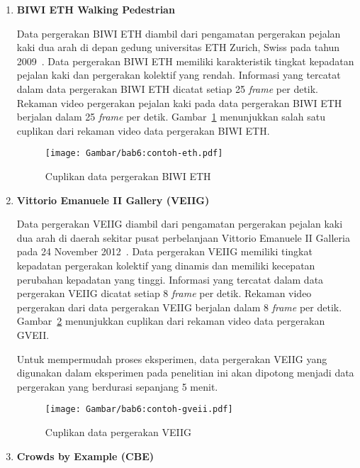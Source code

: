\begin{enumerate}
    \item \textbf{BIWI ETH Walking Pedestrian}
    
    Data pergerakan BIWI ETH diambil dari pengamatan pergerakan pejalan kaki dua arah di depan gedung universitas ETH Zurich, Swiss pada tahun 2009~\cite{pellegrini:eth}. Data pergerakan BIWI ETH memiliki karakteristik tingkat kepadatan pejalan kaki dan pergerakan kolektif yang rendah. Informasi yang tercatat dalam data pergerakan BIWI ETH dicatat setiap 2\.5 \textit{frame} per detik. Rekaman video pergerakan pejalan kaki pada data pergerakan BIWI ETH berjalan dalam 25 \textit{frame} per detik. Gambar~\ref{bab6:contoh-eth} menunjukkan salah satu cuplikan dari rekaman video data pergerakan BIWI ETH.
    
    \begin{figure}[b!]
        \centering
        \texttt{[image: Gambar/bab6:contoh-eth.pdf]}
        \caption{Cuplikan data pergerakan BIWI ETH}
        \label{bab6:contoh-eth}
    \end{figure}
    
    \item \textbf{Vittorio Emanuele II Gallery (VEIIG)}
    
    Data pergerakan VEIIG diambil dari pengamatan pergerakan pejalan kaki dua arah di daerah sekitar pusat perbelanjaan Vittorio Emanuele II Galleria pada 24 November 2012~\cite{bandini:gveii}. Data pergerakan VEIIG memiliki tingkat kepadatan pergerakan kolektif yang dinamis dan memiliki kecepatan perubahan kepadatan yang tinggi. Informasi yang tercatat dalam data pergerakan VEIIG dicatat setiap 8 \textit{frame} per detik. Rekaman video pergerakan dari data pergerakan VEIIG berjalan dalam 8 \textit{frame} per detik. Gambar~\ref{bab6:contoh-gveii} menunjukkan cuplikan dari rekaman video data pergerakan GVEII.
    
    Untuk mempermudah proses eksperimen, data pergerakan VEIIG yang digunakan dalam eksperimen pada penelitian ini akan dipotong menjadi data pergerakan yang berdurasi sepanjang 5 menit.
    
    \begin{figure}[h]
        \centering
        \texttt{[image: Gambar/bab6:contoh-gveii.pdf]}
        \caption{Cuplikan data pergerakan VEIIG}
        \label{bab6:contoh-gveii}
    \end{figure}
    
    \item \textbf{Crowds by Example (CBE)}
    

\end{enumerate}
